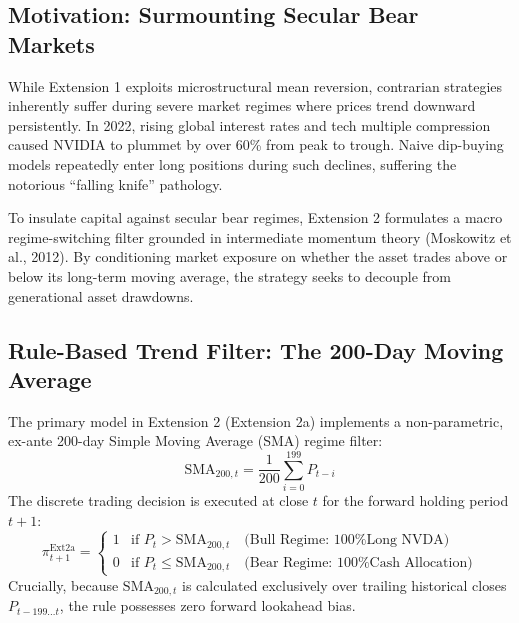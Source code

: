 \documentclass[12pt, a4paper]{article}
\begin{document}
\subsection{Motivation: Surmounting Secular Bear Markets}
While Extension 1 exploits microstructural mean reversion, contrarian strategies inherently suffer during severe market regimes where prices trend downward persistently. In 2022, rising global interest rates and tech multiple compression caused NVIDIA to plummet by over 60\% from peak to trough. Naive dip-buying models repeatedly enter long positions during such declines, suffering the notorious ``falling knife'' pathology. 

To insulate capital against secular bear regimes, Extension 2 formulates a macro regime-switching filter grounded in intermediate momentum theory (Moskowitz et al., 2012). By conditioning market exposure on whether the asset trades above or below its long-term moving average, the strategy seeks to decouple from generational asset drawdowns.

\subsection{Rule-Based Trend Filter: The 200-Day Moving Average}
The primary model in Extension 2 (Extension 2a) implements a non-parametric, ex-ante 200-day Simple Moving Average (SMA) regime filter:
\begin{equation}
\text{SMA}_{200, t} = \frac{1}{200} \sum_{i=0}^{199} P_{t-i}
\end{equation}
The discrete trading decision is executed at close $t$ for the forward holding period $t+1$:
\begin{equation}
\pi_{t+1}^{\text{Ext2a}} = 
\begin{cases}
1 & \text{if } P_t > \text{SMA}_{200, t} \quad \text{(Bull Regime: 100\% Long NVDA)} \\
0 & \text{if } P_t \le \text{SMA}_{200, t} \quad \text{(Bear Regime: 100\% Cash Allocation)}
\end{cases}
\end{equation}
Crucially, because $\text{SMA}_{200, t}$ is calculated exclusively over trailing historical closes $P_{t-199 \dots t}$, the rule possesses zero forward lookahead bias.
\end{document}
